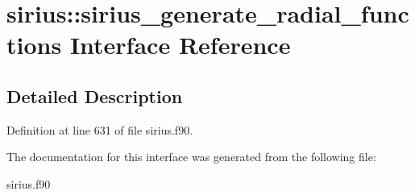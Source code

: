 \hypertarget{interfacesirius_1_1sirius__generate__radial__functions}{}\section{sirius\+:\+:sirius\+\_\+generate\+\_\+radial\+\_\+functions Interface Reference}
\label{interfacesirius_1_1sirius__generate__radial__functions}


\subsection{Detailed Description}


Definition at line 631 of file sirius.\+f90.



The documentation for this interface was generated from the following file\+:\begin{DoxyCompactItemize}
\item 
sirius.\+f90\end{DoxyCompactItemize}
